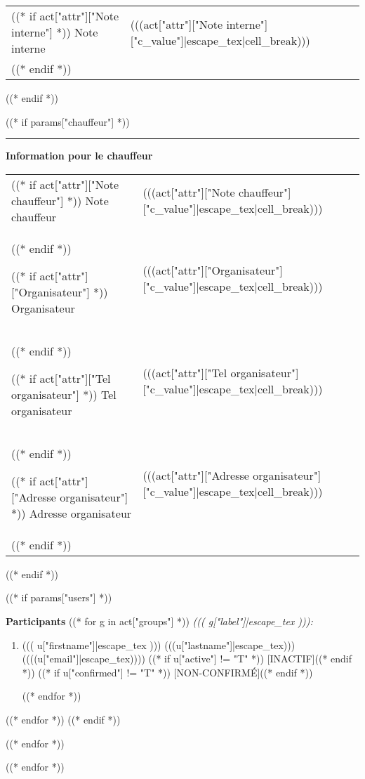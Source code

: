 \begin{minipage}[t]{\textwidth}
\begin{tabulary}{0.9\textwidth}{p{4cm}|L}
((* if act["attr"]["Note interne"] *))
Note interne & (((act["attr"]["Note interne"]["c_value"]|escape_tex|cell_break))) \\
((* endif *))

\end{tabulary}
((* endif *))

((* if params["chauffeur"] *))
\rule{\textwidth}{1pt}

\medskip

\textbf{Information pour le chauffeur}
\medskip

\begin{tabulary}{0.9\textwidth}{p{4cm}|L}

((* if act["attr"]["Note chauffeur"] *))
Note chauffeur & (((act["attr"]["Note chauffeur"]["c_value"]|escape_tex|cell_break))) \\
((* endif *))

((* if act["attr"]["Organisateur"] *))
Organisateur & (((act["attr"]["Organisateur"]["c_value"]|escape_tex|cell_break))) \\
((* endif *))

((* if act["attr"]["Tel organisateur"] *))
Tel organisateur & (((act["attr"]["Tel organisateur"]["c_value"]|escape_tex|cell_break))) \\
((* endif *))

((* if act["attr"]["Adresse organisateur"] *))
Adresse organisateur & (((act["attr"]["Adresse organisateur"]["c_value"]|escape_tex|cell_break))) \\
((* endif *))
\end{tabulary}

((* endif *))


((* if params["users"] *))
\medskip

\textbf{Participants}
\medskip
((* for g in act["groups"] *))
\textit{((( g["label"]|escape_tex ))):}

\begin{enumerate}[noitemsep]
((* for u in g["users"] *))
\item ((( u["firstname"]|escape_tex )))
(((u["lastname"]|escape_tex)))
{(}(((u["email"]|escape_tex))){)}
((* if u["active"] != "T" *)) [INACTIF]((* endif *))
((* if u["confirmed"] != "T" *)) [NON-CONFIRMÉ]((* endif *))

((* endfor *))
\end{enumerate}

((* endfor *))
((* endif *))

\end{minipage}
((* endfor *))

((* endfor *))